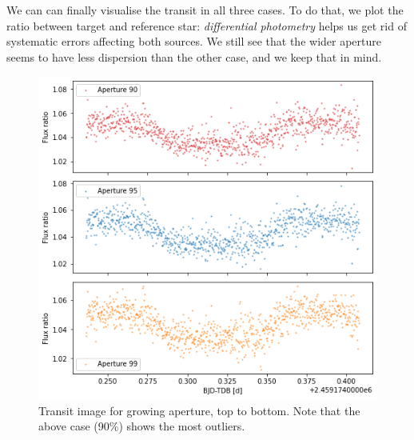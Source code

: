 \documentclass[a4paper,11pt,twocolumn]{article}
\begin{document}
We can can finally visualise the transit in all three cases. To do that, we 
plot the ratio between target and reference star: \textit{differential 
photometry} helps us get rid of systematic errors affecting both sources.
We still see that the wider aperture seems to have less dispersion than 
the other case, and we keep that in mind.
\begin{figure}
    \centering
    \includegraphics[scale=0.4, angle=0]{../pictures/taste/transits.png}
    \caption{Transit image for growing aperture, top to bottom. Note that 
    the above case (90\%) shows the most outliers.}
    \label{fig:transits}
\end{figure}
\end{document}

